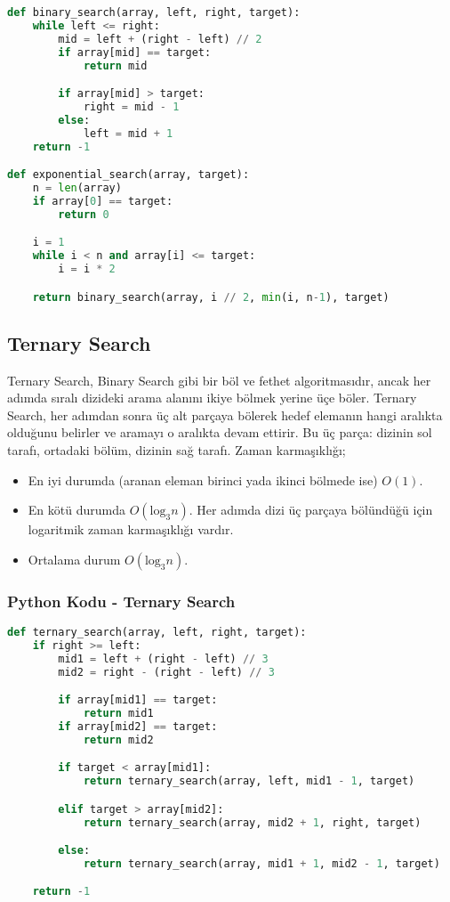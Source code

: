 \begin{lstlisting}[language=Python]
def binary_search(array, left, right, target):
    while left <= right:
        mid = left + (right - left) // 2
        if array[mid] == target:
            return mid

        if array[mid] > target:
            right = mid - 1
        else:
            left = mid + 1
    return -1

def exponential_search(array, target):
    n = len(array)
    if array[0] == target:
        return 0

    i = 1
    while i < n and array[i] <= target:
        i = i * 2

    return binary_search(array, i // 2, min(i, n-1), target)
\end{lstlisting}

\newpage

\subsection{Ternary Search}

Ternary Search, Binary Search gibi bir böl ve fethet algoritmasıdır, ancak her adımda sıralı dizideki arama alanını ikiye bölmek yerine üçe böler. Ternary Search, her adımdan sonra üç alt parçaya bölerek hedef elemanın hangi aralıkta olduğunu belirler ve aramayı o aralıkta devam ettirir. Bu üç parça: dizinin sol tarafı, ortadaki bölüm, dizinin sağ tarafı. Zaman karmaşıklığı;

\begin{itemize}
    \item En iyi durumda (aranan eleman birinci yada ikinci bölmede ise) $O(1)$.
    \item En kötü durumda $O(\text{log}_3 n)$. Her adımda dizi üç parçaya bölündüğü için logaritmik zaman karmaşıklığı vardır.
    \item Ortalama durum $O(\text{log}_3 n)$.
\end{itemize}

\subsubsection{Python Kodu - Ternary Search}

\begin{lstlisting}[language=Python]
def ternary_search(array, left, right, target):
    if right >= left:
        mid1 = left + (right - left) // 3
        mid2 = right - (right - left) // 3

        if array[mid1] == target:
            return mid1
        if array[mid2] == target:
            return mid2

        if target < array[mid1]:
            return ternary_search(array, left, mid1 - 1, target)

        elif target > array[mid2]:
            return ternary_search(array, mid2 + 1, right, target)

        else:
            return ternary_search(array, mid1 + 1, mid2 - 1, target)

    return -1
\end{lstlisting}

